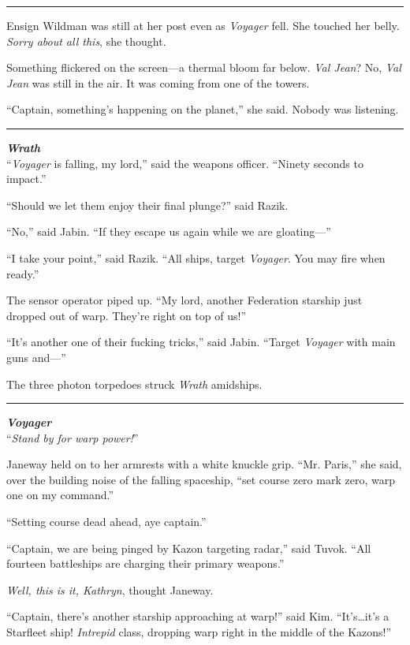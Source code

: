 \documentclass[twoside,letterpaper,12pt]{memoir}
\begin{document}
\fancybreak{\rule{3cm}{0.4 pt}}
Ensign Wildman was still at her post even as \textit{Voyager} fell. She touched her belly. \textit{Sorry about all this}, she thought.

Something flickered on the screen---a thermal bloom far below. \textit{Val Jean}? No, \textit{Val Jean} was still in the air. It was coming from one of the towers.

``Captain, something's happening on the planet,'' she said. Nobody was listening.

\fancybreak{\rule{3cm}{0.4 pt}}
\noindent\textit{\textbf{Wrath}}\\

``\textit{Voyager} is falling, my lord,'' said the weapons officer. ``Ninety seconds to impact.''

``Should we let them enjoy their final plunge?'' said Razik.

``No,'' said Jabin. ``If they escape us again while we are gloating---''

``I take your point,'' said Razik. ``All ships, target \textit{Voyager}. You may fire when ready.''

The sensor operator piped up. ``My lord, another Federation starship just dropped out of warp. They're right on top of us!''

``It's another one of their fucking tricks,'' said Jabin. ``Target \textit{Voyager} with main guns and---''

The three photon torpedoes struck \textit{Wrath} amidships.

\fancybreak{\rule{3cm}{0.4 pt}}
\noindent\textit{\textbf{Voyager}}\\

``\textit{Stand by for warp power!}''

Janeway held on to her armrests with a white knuckle grip. ``Mr. Paris,'' she said, over the building noise of the falling spaceship, ``set course zero mark zero, warp one on my command.''

``Setting course dead ahead, aye captain.''

``Captain, we are being pinged by Kazon targeting radar,'' said Tuvok. ``All fourteen battleships are charging their primary weapons.''

\textit{Well, this is it, Kathryn}, thought Janeway.

``Captain, there's another starship approaching at warp!'' said Kim. ``It's\ldots it's a Starfleet ship! \textit{Intrepid} class, dropping warp right in the middle of the Kazons!''
\end{document}
